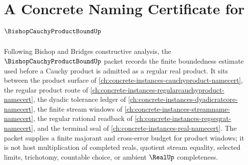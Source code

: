 \chapter{A Concrete Naming Certificate for $\BishopCauchyProductBoundUp$}
\label{ch:concrete-instances-bishop-cauchy-product-bound-namecert}

Following Bishop and Bridges constructive analysis, the $\BishopCauchyProductBoundUp$ packet records the finite boundedness estimate used before a Cauchy product is admitted as a regular real product. It sits between the product surface of \autoref{ch:concrete-instances-cauchyproduct-namecert}, the regular product route of \autoref{ch:concrete-instances-regularcauchyproduct-namecert}, the dyadic tolerance ledger of \autoref{ch:concrete-instances-dyadicratcore-namecert}, the finite stream windows of \autoref{ch:concrete-instances-streamname-namecert}, the regular rational readback of \autoref{ch:concrete-instances-regseqrat-namecert}, and the terminal seal of \autoref{ch:concrete-instances-real-namecert}. The packet supplies a finite majorant and cross-error budget for product windows; it is not host multiplication of completed reals, quotient stream equality, selected limits, trichotomy, countable choice, or ambient $\RealUp$ completeness.


